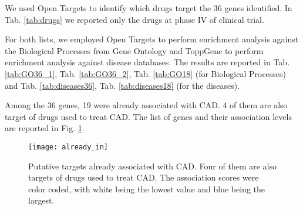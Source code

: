 \documentclass[fleqn,10pt]{SelfArx} %
\begin{document}
We used Open Targets to identify which drugs target the 36 genes identified. In Tab. \ref{tab:drugs} we reported only the drugs at phase IV of clinical trial.

For both lists, we employed Open Targets to perform enrichment analysis against the Biological Processes from Gene Ontology and ToppGene to perform enrichment analysis against disease databases. The results are reported in Tab. \ref{tab:GO36_1}, Tab. \ref{tab:GO36_2}, Tab. \ref*{tab:GO18} (for Biological Processes) and Tab. \ref{tab:diseases36}, Tab. \ref{tab:diseases18} (for the diseases).

Among the 36 genes, 19 were already associated with CAD. 4 of them are also target of drugs used to treat CAD. The list of genes and their association levels are reported in Fig. \ref{fig:19CAD}.

\begin{figure}[ht]
	\texttt{[image: already\_in]}
	\smallskip
	\caption{Putative targets already associated with CAD. Four of them are also targets of drugs used to treat CAD. The association scores were color coded, with white being the lowest value and blue being the largest.}
	\label{fig:19CAD}
\end{figure}
\end{document}
